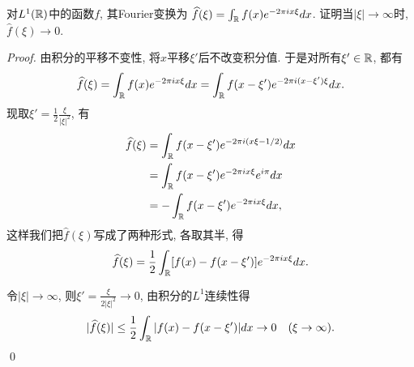 \begin{example}[~(黎曼-勒贝格引理)]
    对$L^1(\mathbb{R})$中的函数$f$, 其Fourier变换为
    $\widehat{f}(\xi) = \int_{\mathbb{R}} f(x)e^{-2\pi i x\xi}dx$.
    证明当$|\xi| \to \infty$时, $\hat{f}(\xi) \to 0$.
\end{example}
\begin{proof}

    由积分的平移不变性, 将$x$平移$\xi'$后不改变积分值. 于是对所有$\xi' \in \mathbb{R}$, 都有 
    $$\widehat{f}(\xi) = \int_{\mathbb{R}} f(x)e^{-2\pi ix\xi}dx 
    = \int_{\mathbb{R}} f(x-\xi')e^{-2\pi i(x-\xi')\xi}dx.$$
    现取$\xi' = \frac{1}{2}\frac{\xi}{|\xi|^2}$, 有
    \begin{align*}
    \widehat{f}(\xi) &= \int_{\mathbb{R}} f(x-\xi')e^{-2\pi i (x\xi - 1/2)}dx \\
    &= \int_{\mathbb{R}} f(x-\xi')e^{-2\pi i x\xi}e^{i\pi}dx \\
    &= -\int_{\mathbb{R}} f(x-\xi')e^{-2\pi i x\xi}dx, 
    \end{align*}
    这样我们把$\hat{f}(\xi)$写成了两种形式, 各取其半, 得 
    $$\widehat{f}(\xi) = \frac{1}{2} \int_{\mathbb{R}}[f(x)-f(x-\xi')]e^{-2\pi i x\xi}dx.$$
    
    令$|\xi| \to \infty$, 则$\xi' = \frac{\xi}{2|\xi|^2} \to 0$,
    由积分的$L^1$连续性得
    $$|\widehat{f}(\xi)| \leq \frac{1}{2}
     \int_{\mathbb{R}}|f(x)-f(x-\xi')|dx\to 0 \quad (\xi \to \infty).$$ \qed 
\end{proof}


